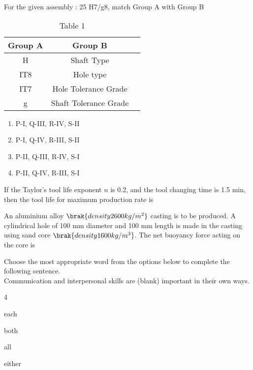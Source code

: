 \iffalse
\title{GATE Questions 10}
\author{EE24BTECH11012 - Bhavanisankar G S}
\section{me}
\chapter{2014}
\fi
	\item For the given assembly : 25 H7/g8, match Group A with Group B
		\begin{table}[h!]
\centering
\caption{Table 1}
\begin{tabular}{|c|c|c|}
\hline
\textbf{Group A} & \textbf{Group B} \\
\hline
H & Shaft Type \\
\hline
IT8 & Hole type \\
\hline
IT7 & Hole Tolerance Grade \\
\hline
g & Shaft Tolerance Grade \\
\hline
\end{tabular}
\label{tab : Table 1}
\end{table}
		\begin{enumerate}
			\item P-I, Q-III, R-IV, S-II
			\item P-I, Q-IV, R-III, S-II
			\item P-II, Q-III, R-IV, S-I
			\item P-II, Q-IV, R-III, S-I
		\end{enumerate}
	\item If the Taylor's tool life exponent $n$ is 0.2, and the tool changing time is 1.5 min, then the tool life  for maximum production rate is
	\item An aluminium alloy $\brak{density 2600 kg/m^2}$ casting is to be produced. A cylindrical hole of 100 mm diameter and 100 mm length is made in the casting using sand core $\brak{density 1600 kg/m^3}$. The net buoyancy force  acting on the core is
	\item Choose the most appropriate word from the options below to complete the following sentence. \\
		Communication and interpersonal skills are (blank) important in their own ways.
		\begin{enumerate}
		\end{enumerate}
